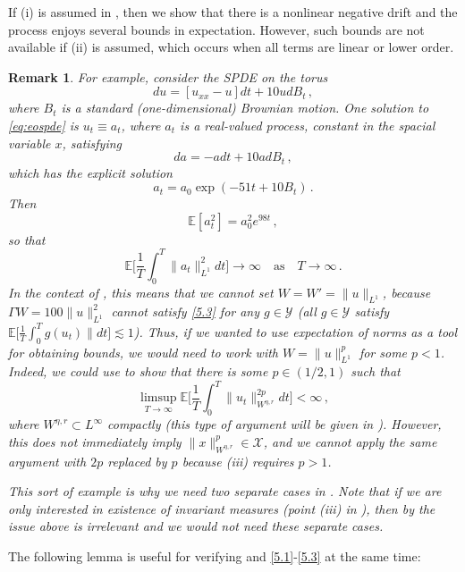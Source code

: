 \documentclass[final]{amsart}
\newtheorem{rem}[thm]{Remark}
\numberwithin{thm}{section}
\numberwithin{equation}{section}
\newcommand{\E}{\mathbb{E}}
\newcommand{\X}{\mathcal{X}}
\newcommand{\Y}{\mathcal{Y}}
\begin{document}
If (i) is assumed in , then we show that there is a nonlinear negative drift and the process enjoys several bounds in expectation. However, such bounds are not available if (ii) is assumed, which occurs when all terms are linear or lower order.


\begin{rem}
    For example, consider the SPDE on the torus
    \begin{equation}\label{eq:eospde}
    du = [u_{xx} - u]dt + 10udB_t \,,    
    \end{equation}
    where $B_t$ is a standard (one-dimensional) Brownian motion. One solution to \eqref{eq:eospde} is $u_t \equiv a_t$, where $a_t$ is a real-valued process, constant in the spacial variable $x$, satisfying
    $$da = -adt + 10adB_t \,,$$
    which has the explicit solution
    $$a_t = a_0\exp(-51t + 10B_t) \,.$$
    Then 
    $$\E[a_t^2] = a_0^2e^{98t} \,,$$
    so that
    $$\E\Big[\frac{1}{T}\int_0^T \|a_t\|_{L^1}^2dt\Big] \to \infty \quad \text{as} \quad T \to \infty \,.$$
    In the context of , this means that we cannot set $W = W' = \|u\|_{L^1}$, because $\Gamma W = 100\|u\|_{L^1}^2$ cannot satisfy \ref{5.3} for any $g \in \Y$ (all $g \in \Y$ satisfy $\E\big[\frac{1}{T}\int_0^T g(u_t)\|dt\big] \lesssim 1$). Thus, if we wanted to use expectation of norms as a tool for obtaining bounds, we would need to work with $W = \|u\|_{L^1}^p$ for some $p < 1$. Indeed, we could use  to show that there is some $p \in (1/2,1)$ such that 
    $$\limsup_{T \to \infty}\E\Big[\frac{1}{T}\int_0^T \|u_t\|_{W^{\eta,r}}^{2p}dt\Big] < \infty \,,
    $$
    where $W^{\eta,r} \subset L^\infty$ compactly (this type of argument will be given in ). However, this does not immediately imply $\|x\|_{W^{\eta,r}}^p \in \X$, and we cannot apply the same argument with $2p$ replaced by $p$ because (iii) requires $p > 1$.

    This sort of example is why we need two separate cases in . Note that if we are only interested in existence of invariant measures (point (iii) in ), then by  the issue above is irrelevant and we would not need these separate cases.
\end{rem}


The following lemma is useful for verifying  and \ref{5.1}-\ref{5.3} at the same time:
\end{document}
